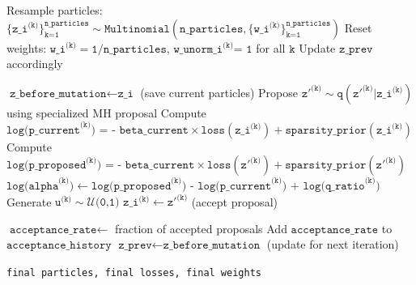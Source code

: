 \documentclass[11pt]{article}
\begin{document}
\begin{algorithm}
\begin{algorithmic}[1]
		 
		\State Resample particles: $\{\texttt{z\_i}^{\texttt{(k)}}\}_{\texttt{k=1}}^{\texttt{n\_particles}} \sim \texttt{Multinomial}(\texttt{n\_particles}, \{\texttt{w\_i}^{\texttt{(k)}}\}_{\texttt{k=1}}^{\texttt{n\_particles}})$
		\State Reset weights: $\texttt{w\_i}^{\texttt{(k)}} = \texttt{1/n\_particles}$, $\texttt{w\_unorm\_i}^{\texttt{(k)}} \texttt{= 1}$ for all $\texttt k$
		\State Update $\texttt{z\_prev}$ accordingly
		\EndIf
		
		\State $\texttt{z\_before\_mutation} \leftarrow \texttt{z\_i}$ (save current particles)
		 
		\State Propose $\texttt{z}'^{\texttt{(k)}} \sim \texttt{q}(\texttt{z}'^{\texttt{(k)}} | \texttt{z\_i}^{\texttt{(k)}})$ using specialized MH proposal
		\State Compute $ \texttt{log(p\_current}^{\texttt{(k)}} \texttt{) = - beta\_current} \times \texttt{loss}(\texttt{z\_i}^{\texttt{(k)}}) + \texttt{sparsity\_prior}(\texttt{z\_i}^{\texttt{(k)}})$
		\State Compute $\texttt{log(p\_proposed}^{\texttt{(k)}} \texttt{) = - beta\_current} \times \texttt{loss}(\texttt{z}'^{\texttt{(k)}}) + \texttt{sparsity\_prior}(\texttt{z}'^{\texttt{(k)}})$
		\State $\texttt{log(alpha}^{\texttt{(k)}} \texttt) \leftarrow  \texttt{log(p\_proposed}^{\texttt{(k)}}  \texttt{) -  log(p\_current}^{\texttt{(k)}}  \texttt{) + log(q\_ratio}^{\texttt{(k)}}\texttt)$
		\State Generate $\texttt{u}^{\texttt{(k)}} \sim \mathcal{U}\texttt{(0,1)}$
		\State $\texttt{z\_i}^{\texttt{(k)}} \leftarrow \texttt{z}'^{\texttt{(k)}}$ (accept proposal)
		\EndIf
		\EndFor
		
		\State $\texttt{acceptance\_rate} \leftarrow$ fraction of accepted proposals
		\State Add $\texttt{acceptance\_rate}$ to $\texttt{acceptance\_history}$
		\State $\texttt{z\_prev} \leftarrow \texttt{z\_before\_mutation}$ (update for next iteration)
		
		\EndFor
		
		\Return \texttt{final particles, final losses, final weights}
	\end{algorithmic}
\end{algorithm}
\end{document}
